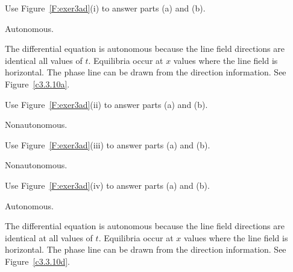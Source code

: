 \documentclass{ximera}
\begin{document}
\begin{exercise} \label{c3.3.10a}
Use Figure~\ref{F:exer3ad}(i) to answer parts (a) and (b).

\begin{solution}
\ans Autonomous.

\soln  The differential equation is autonomous because the line field 
directions are identical all values of $t$.  Equilibria occur at $x$ values 
where the line field is horizontal.  The phase line can be drawn from the 
direction information.  See Figure~\ref{c3.3.10a}.

\begin{figure}[ht]
     \centerline{%
     }
\end{figure} 

\end{solution}
\end{exercise}
\begin{exercise} \label{c3.3.10b}
Use Figure~\ref{F:exer3ad}(ii) to answer parts (a) and (b).

\begin{solution}
Nonautonomous.

\end{solution}
\end{exercise}
\begin{exercise} \label{c3.3.10c}
Use Figure~\ref{F:exer3ad}(iii) to answer parts (a) and (b).

\begin{solution}
Nonautonomous.

\end{solution}
\end{exercise}
\begin{exercise} \label{c3.3.10d}
Use Figure~\ref{F:exer3ad}(iv) to answer parts (a) and (b).

\begin{solution}
\ans Autonomous.

\soln  The differential equation is autonomous because the line field 
directions are identical at all values of $t$.  Equilibria occur at
$x$ values where the line field is horizontal.  The phase line can be
drawn from the direction information.  See Figure~\ref{c3.3.10d}.

\begin{figure}[ht]
     \centerline{%
     }
\end{figure}





\end{solution}
\end{exercise}
\end{document}
